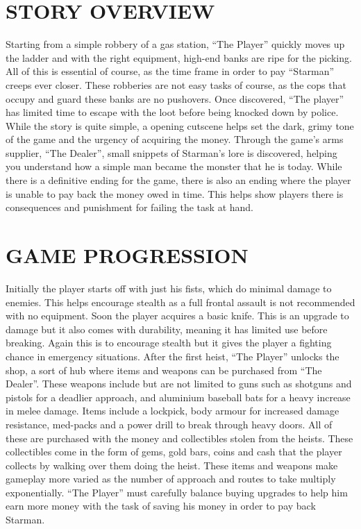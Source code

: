 \documentclass{article}
\begin{document}
\section{STORY OVERVIEW \label{storyover}}
Starting from a simple robbery of a gas station, “The Player” quickly moves up the ladder and with the right equipment, high-end banks are ripe for the picking. All of this is essential of course, as the time frame in order to pay “Starman” creeps ever closer.
\bigbreak
These robberies are not easy tasks of course, as the cops that occupy and guard these banks are no pushovers. Once discovered, “The player” has limited time to escape with the loot before being knocked down by police.
\bigbreak
While the story is quite simple, a opening cutscene helps set the dark, grimy tone of the game and the urgency of acquiring the money. Through the game’s arms supplier, “The Dealer”, small snippets of Starman’s lore is discovered, helping you understand how a simple man became the monster that he is today.
\bigbreak
While there is a definitive ending for the game, there is also an ending where the player is unable to pay back the money owed in time. This helps show players there is consequences and punishment for failing the task at hand.

\section{GAME PROGRESSION \label{progression}}
Initially the player starts off with just his fists, which do minimal damage to enemies. This helps encourage stealth as a full frontal assault is not recommended with no equipment. Soon the player acquires a basic knife. This is an upgrade to damage but it also comes with durability, meaning it has limited use before breaking. Again this is to encourage stealth but it gives the player a fighting chance in emergency situations.
\bigbreak
After the first heist, “The Player” unlocks the shop, a sort of hub where items and weapons can be purchased from “The Dealer”. These weapons include but are not limited to guns such as shotguns and pistols for a deadlier approach, and aluminium baseball bats for a heavy increase in melee damage.
\bigbreak
Items include a lockpick, body armour for increased damage resistance, med-packs and a power drill to break through heavy doors.
 \bigbreak
All of these are purchased with the money and collectibles stolen from the heists. These collectibles come in the form of gems, gold bars, coins and cash that the player collects by walking over them doing the heist.
\bigbreak
These items and weapons make gameplay more varied as the number of approach and routes to take multiply exponentially. “The Player” must carefully balance buying upgrades to help him earn more money with the task of saving his money in order to pay back Starman.
\end{document}
